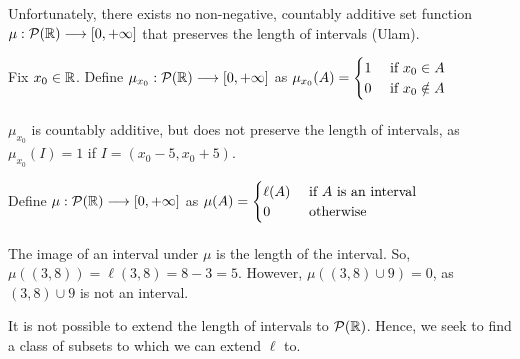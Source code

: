 \documentclass[a4paper]{book}
\begin{document}
Unfortunately, there exists no non-negative, countably additive set function $\mu : \mathcal{P}(\mathbb{R}) \longrightarrow [0,+\infty]$ that preserves the length of intervals (Ulam). 
\begin{exampleT}
Fix $x_0 \in \mathbb{R}$. Define $\mu_{x_0}:\mathcal{P}(\mathbb{R}) \longrightarrow [0, +\infty]$ as $\mu_{x_0}(A) = \begin{cases} 1 & \text{ if } x_0 \in A \\  0 & \text{ if } x_0 \notin A \end{cases}$\\\\
$\mu_{x_0}$ is countably additive, but does not preserve the length of intervals, as $\mu_{x_0} (I) = 1$ if $I = (x_0-5, x_0+5)$.
\end{exampleT}
\begin{exampleT}
Define $\mu:\mathcal{P}(\mathbb{R}) \longrightarrow [0, +\infty]$ as $\mu(A) = \begin{cases} \ell(A) & \text{ if } A \text{ is an interval } \\  0 & \text{ otherwise} \end{cases}$\\\\
The image of an interval under $\mu$ is the length of the interval. So,  $\mu((3,8)) = \ell(3,8) = 8-3 = 5$. However, $\mu ((3,8) \cup \qty{9}) = 0$, as $(3,8) \cup \qty{9}$ is not an interval.
\end{exampleT}
\noindent It is not possible to extend the length of intervals to $\mathcal{P}(\mathbb{R})$. Hence, we seek to find a class of subsets to which we can extend $\ell$ to.\\
\begin{figure}[h]
\centering
{}
\end{figure}\\
\end{document}
